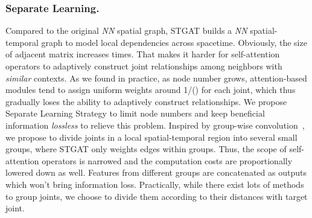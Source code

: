 \documentclass[runningheads]{llncs}
\begin{document}
\subsubsection{Separate Learning.}
Compared to the original \textit{N}\textit{N} spatial graph, STGAT builds a \textit{N}\textit{N} spatial-temporal graph to model local dependencies across spacetime. Obviously, the size of adjacent matrix increases  times. That makes it harder for self-attention operators to adaptively construct joint relationships among neighbors with \textit{similar} contexts.  As we found in practice, as node number grows, attention-based modules tend to assign uniform weights around 1/() for each joint, which thus gradually loses the ability to adaptively construct relationships. We propose Separate Learning Strategy to limit node numbers and keep beneficial information \textit{lossless} to relieve this problem. Inspired by group-wise convolution~\cite{krizhevsky2012imagenet}, we propose to divide joints in a local spatial-temporal region into several small groups, where STGAT only weights edges within groups. Thus, the scope of self-attention operators is narrowed and the computation costs are proportionally lowered down as well. Features from different groups are concatenated as outputs which won't bring information loss. Practically, while there exist lots of methods to group joints, we choose to divide them according to their distances with target joint. 
  
\end{document}
